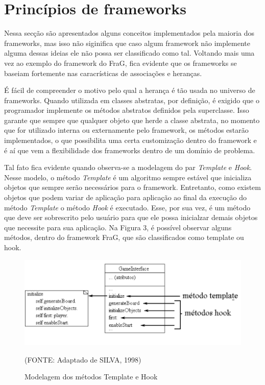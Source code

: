 \documentclass[
    12pt,       %
    openright,      %
    twoside,      %
    a4paper,      %
    english,      %
    french,       %
    spanish,      %
    brazil,       %
    ]{abntex2}
\begin{document}
      \section{Princípios de frameworks}
          Nessa secção são apresentados alguns conceitos implementados pela maioria
          dos frameworks, mas isso não siginifica que caso algum framework não implemente
          alguma dessas ideias ele não possa ser classificado como tal. Voltando mais uma
          vez ao exemplo do framework do FraG, fica evidente que os frameworks se baseiam
          fortemente nas caracrísticas de associações e heranças.

          É fácil de compreender o motivo pelo qual a herança é tão usada no universo de
          frameworks. Quando utilizada em classes abstratas, por definição, é exigido que
          o programador implemente os métodos abstratos definidos pela superclasse. Isso
          garante que sempre que qualquer objeto que herde a classe abstrata, no momento
          que for utilizado interna ou externamente pelo framework, os métodos estarão
          implementados, o que possibilita uma certa customização dentro do framework e
          é aí que vem a flexibilidade dos frameworks dentro de um domínio de problema.

          Tal fato fica evidente quando observa-se a modelagem do par \textit{Template} e
          \textit{Hook}. Nesse modelo, o método \textit{Template} é um algoritmo sempre
          estável que inicializa objetos que sempre serão necessários para o framework.
          Entretanto, como existem objetos que podem variar de aplicação para aplicação
          ao final da execução do método \textit{Template} o método \textit{Hook} é
          executado. Esse, por sua vez, é um método que deve ser sobrescrito pelo usuário
          para que ele possa inicialzar demais objetos que necessite para sua aplicação.
          Na Figura 3, é possível observar alguns métodos, dentro do framework FraG, que
          são classificados como template ou hook.

          \begin{figure}[htbp]
              \begin{center}
                  \includegraphics[width=1.0\textwidth]{img/templateHook.png}
              \end{center}
              \caption{\label{fig:passaro}Modelagem dos métodos Template e Hook}
              \begin{center}(FONTE: Adaptado de SILVA, 1998)\end{center}
          \end{figure}
\end{document}

